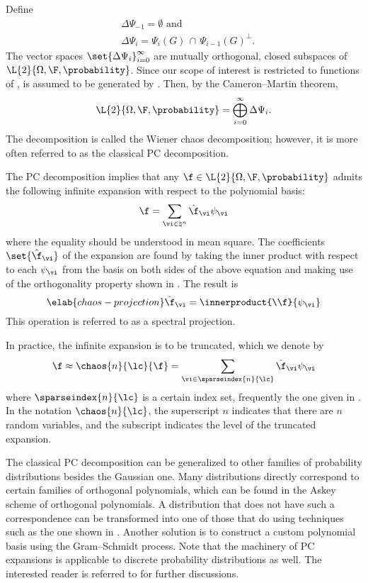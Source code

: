 Define
\begin{align*}
  & \Delta\Psi_{-1} = \emptyset \text{ and} \\
  & \Delta\Psi_i = \Psi_i(G) \, \cap \, \Psi_{i - 1}(G)^\perp.
\end{align*}
The vector spaces $\set{\Delta\Psi_i}_{i = 0}^\infty$ are mutually orthogonal,
closed subspaces of $\L{2}{\Omega, \F, \probability}$. Since our scope of
interest is restricted to functions of \vx, \F is assumed to be generated by
\vx. Then, by the Cameron--Martin theorem,
\[
  \L{2}{\Omega, \F, \probability} = \bigoplus_{i = 0}^\infty \Delta\Psi_i.
\]
The decomposition is called the Wiener chaos decomposition; however, it is more
often referred to as the classical \ac{PC} decomposition.

The \ac{PC} decomposition implies that any $\f \in \L{2}{\Omega, \F,
\probability}$ admits the following infinite expansion with respect to the
polynomial basis:
\[
  \f = \sum_{\vi \in \natural^n} \hat{\f}_{\vi} \psi_{\vi}
\]
where the equality should be understood in mean square. The coefficients
$\set{\hat{\f}_{\vi}}$ of the expansion are found by taking the inner product
with respect to each $\psi_{\vi}$ from the basis on both sides of the above
equation and making use of the orthogonality property shown in
. The result is
\begin{equation} \elab{chaos-projection}
  \hat{\f}_{\vi} = \innerproduct{\\f}{\psi_{\vi}}
\end{equation}
This operation is referred to as a spectral projection.

In practice, the infinite expansion is to be truncated, which we denote by
\[
  \f \approx \chaos{n}{\lc}{\f} = \sum_{\vi \in \sparseindex{n}{\lc}} \hat{\f}_{\vi} \psi_{\vi}
\]
where $\sparseindex{n}{\lc}$ is a certain index set, frequently the one given in
. In the notation $\chaos{n}{\lc}$, the
superscript $n$ indicates that there are $n$ random variables, and the subscript
\lc indicates the level of the truncated expansion.

The classical \ac{PC} decomposition can be generalized to other families of
probability distributions besides the Gaussian one. Many distributions directly
correspond to certain families of orthogonal polynomials, which can be found in
the Askey scheme of orthogonal polynomials. A distribution that does not have
such a correspondence can be transformed into one of those that do using
techniques such as the one shown in . Another
solution is to construct a custom polynomial basis using the Gram--Schmidt
process. Note that the machinery of \ac{PC} expansions is applicable to discrete
probability distributions as well. The interested reader is referred to
\cite{xiu2010} for further discussions.
